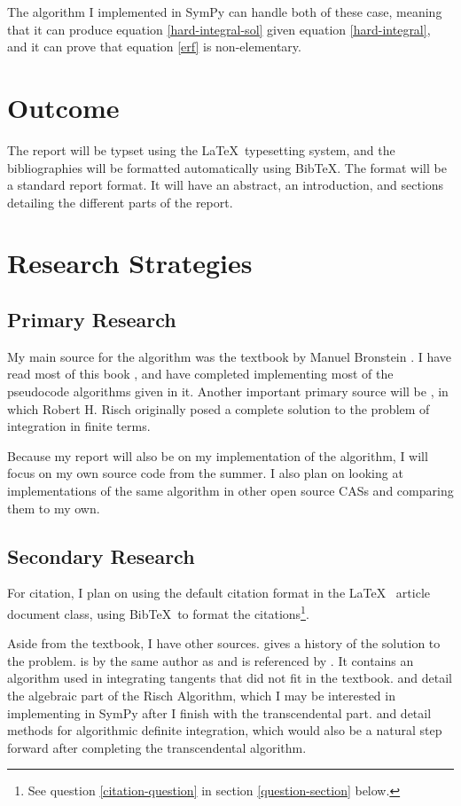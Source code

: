 \documentclass[12pt]{article}
\newcommand{\BibTeX}{{\sc Bib}\TeX}
\newcommand{\bibtex}{{\sc Bib}\TeX\ }
\newcommand{\latex}{\LaTeX\ }
\begin{document}
The algorithm I implemented in Sym\-Py can handle both of these case,
meaning that it can produce equation \ref{hard-integral-sol} given
equation \ref{hard-integral}, and it can prove that equation \ref{erf}
is non-elementary.

\section{Outcome}
The report will be typset using the \latex typesetting system, and the
bibliographies will be formatted automatically using \BibTeX.  The
format will be a standard report format.  It will have an abstract, an
introduction, and sections detailing the different parts of the report.
\section{Research Strategies}
\subsection{Primary Research}
My main source for the algorithm was the textbook by Manuel Bronstein
\cite{bronstein2005symbolic}.  I have read most of this book , and have
completed implementing most of the pseudocode algorithms given in it.
Another important primary source will be \cite{risch1969problem}, in
which Robert H. Risch originally posed a complete solution to the
problem of integration in finite terms.  

Because my report will also be on my implementation of the algorithm, I
will focus on my own source code from the summer.  I also plan on
looking at implementations of the same algorithm in other open source
CASs and comparing them to my own.
\subsection{Secondary Research}
\label{secondary-research}
For citation, I plan on using the default citation format in the \latex
article document class, using \bibtex to format the
citations\footnote{See question \ref{citation-question} in section
\ref{question-section} below.}.

Aside from the textbook, I have other sources. \cite{moses1971symbolic}
gives a history of the solution to the problem.
\cite{bronstein1989simplification} is by the same author as and is
referenced by \cite{bronstein1989simplification}.  It contains an
algorithm used in integrating tangents that did not fit in the textbook.
\cite{davenport1984integration} and \cite{kauers2008integration} detail
the algebraic part of the Risch Algorithm, which I may be interested in
implementing in Sym\-Py  after I finish with the transcendental part.
\cite{adamchik1990hypergeometric} and \cite{roach1997meijerg} detail
methods for algorithmic definite integration, which would also be a
natural step forward after completing the transcendental algorithm.
\end{document}
